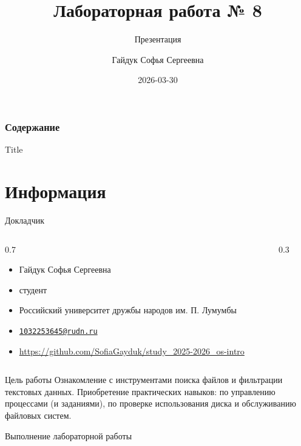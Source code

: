 \documentclass[
  ignorenonframetext,
  aspectratio=169,
]{beamer}
\title{Лабораторная работа № 8}
\subtitle{Презентация}
\author{Гайдук Софья Сергеевна}
\date{2026-03-30}
\providecommand{\tightlist}{%
  \setlength{\itemsep}{0pt}\setlength{\parskip}{0pt}}\usepackage{longtable,booktabs,array}
\renewcommand*\contentsname{Table of contents}
\newcommand\contentsname{Table of contents}
\begin{document}
\frame{\titlepage}

\renewcommand*\contentsname{Содержание}
\begin{frame}[allowframebreaks]
  \frametitle{Содержание}
  \setcounter{tocdepth}{1}
  \tableofcontents
\end{frame}

\begin{frame}{Title}
\label{title}
\end{frame}

\section{Информация}\label{ux438ux43dux444ux43eux440ux43cux430ux446ux438ux44f}

\begin{frame}{Докладчик}
\label{ux434ux43eux43aux43bux430ux434ux447ux438ux43a}
\begin{columns}[c]
\begin{column}{0.7\linewidth}
\begin{itemize}[<+->]
\tightlist
\item
  Гайдук Софья Сергеевна
\item
  студент
\item
  Российский университет дружбы народов им. П. Лумумбы
\item
  \href{mailto:1032253645@rudn.ru}{\nolinkurl{1032253645@rudn.ru}}
\item
  \url{https://github.com/SofiaGayduk/study_2025-2026_os-intro}
\end{itemize}
\end{column}

\begin{column}{0.3\linewidth}
\end{column}
\end{columns}
\end{frame}

\begin{frame}{Цель работы}
\label{ux446ux435ux43bux44c-ux440ux430ux431ux43eux442ux44b}
Ознакомление с инструментами поиска файлов и фильтрации текстовых
данных. Приобретение практических навыков: по управлению процессами (и
заданиями), по проверке использования диска и обслуживанию файловых
систем.
\end{frame}

\begin{frame}{Выполнение лабораторной работы}
\label{ux432ux44bux43fux43eux43bux43dux435ux43dux438ux435-ux43bux430ux431ux43eux440ux430ux442ux43eux440ux43dux43eux439-ux440ux430ux431ux43eux442ux44b}
\end{frame}
\end{document}
